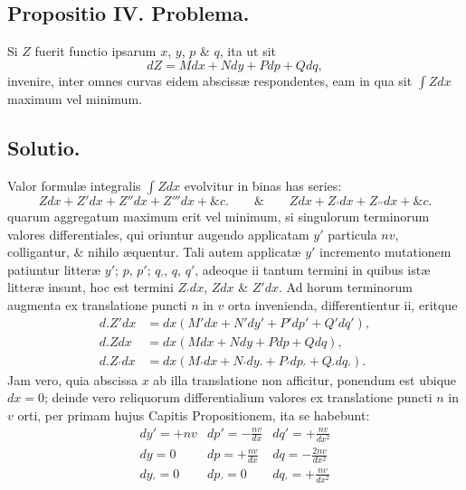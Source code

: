 \subsection*{Propositio IV. Problema.}
Si $Z$ fuerit functio ipsarum $x$, $y$, $p$ \& $q$, ita ut sit
\[
dZ=Mdx+Ndy+Pdp+Qdq,
\]
invenire, inter omnes curvas eidem abscissæ respondentes, eam in qua sit $\int Zdx$ maximum vel minimum.

\subsection*{Solutio.}
Valor formulæ integralis $\int Zdx$ evolvitur in binas has series:
\[
Zdx+Z'dx+Z''dx+Z'''dx+\&c.\qquad\&\qquad Zdx+Z_{\prime}dx+Z_{\prime\prime}dx+\&c.
\]
quarum aggregatum maximum erit vel minimum, si singulorum terminorum valores differentiales, qui oriuntur augendo applicatam $y'$ particula $nv$, colligantur, \& nihilo æquentur. Tali autem applicatæ $y'$ incremento mutationem patiuntur litteræ $y'$; $p$, $p'$; $q_{\prime}$, $q$, $q'$, adeoque ii tantum termini in quibus istæ litteræ insunt, hoc est termini $Z_{\prime}dx$, $Zdx$ \& $Z'dx$. Ad horum terminorum augmenta ex translatione puncti $n$ in $v$ orta invenienda, differentientur ii, eritque
\[
\begin{aligned}
d.Z'dx&=dx(M'dx+N'dy'+P'dp'+Q'dq'),\\
d.Zdx&=dx(Mdx+Ndy+Pdp+Qdq),\\
d.Z_{\prime}dx&=dx(M_{\prime}dx+N_{\prime}dy_{\prime}+P_{\prime}dp_{\prime}+Q_{\prime}dq_{\prime}).
\end{aligned}
\]
Jam vero, quia abscissa $x$ ab illa translatione non afficitur, ponendum est ubique $dx=0$; deinde vero reliquorum differentialium valores ex translatione puncti $n$ in $v$ orti, per primam hujus Capitis Propositionem, ita se habebunt:
\[
\renewcommand{\arraystretch}{1.4}
\begin{array}{c|c|c}
dy'=+nv&dp'=-\frac{nv}{dx}&dq'=+\frac{nv}{dx^2}\\
dy=0&dp=+\frac{nv}{dx}&dq=-\frac{2nv}{dx^2}\\
dy_{\prime}=0&dp_{\prime}=0&dq_{\prime}=+\frac{nv}{dx^2}
\end{array}
\]

